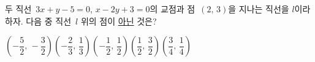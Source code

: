 두 직선~$3x+y-5=0$, $x-2y+3=0$의 교점과 점~$(2,\,3)$을 지나는 직선을 $l$이라 하자. 다음 중 직선~$l$ 위의 점이 \underline{아닌} 것은?
\begin{choicesii}{$\left(-\dfrac{5}{2},\,-\dfrac{3}{2}\right)$}{$\left(-\dfrac{2}{3},\,\dfrac{1}{3}\right)$}{$\left(-\dfrac{1}{2},\,\dfrac{1}{2}\right)$}{$\left(\dfrac{1}{2},\,\dfrac{3}{2}\right)$}{$\left(\dfrac{3}{4},\,\dfrac{1}{4}\right)$}\end{choicesii}
